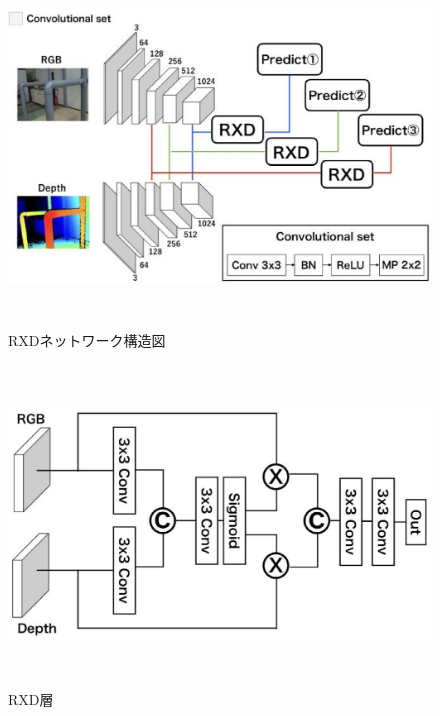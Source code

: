 \clearpage

\begin{figure}[htbt]
	\centering
	 \includegraphics[height=95mm]{rxdnet.eps}
	 \caption{RXDネットワーク構造図}
	 \label{fig:f2}
\end{figure}

\begin{figure}[htbt]
	\centering
	 \includegraphics[height=85mm]{RXD.eps}
	 \caption{RXD層}
	 \label{fig:f2}
\end{figure}

